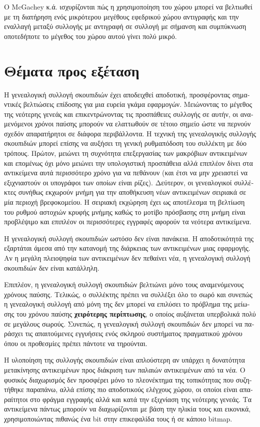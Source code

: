 \begin{greek}
Ο McGachey κ.ά. \cite{DBLP:conf/iwmm/McGacheyH06} ισχυρίζονται
πώς η χρησιμοποίηση του χώρου μπορεί να βελτιωθεί με τη διατήρηση
ενός μικρότερου μεγέθους εφεδρικού χώρου αντιγραφής και την
εναλλαγή μεταξύ συλλογής με αντιγραφή σε συλλογή με σήμανση και
συμπύκνωση οποτεδήποτε το μέγεθος του χώρου αυτού γίνει πολύ
μικρό. 

\section{Θέματα προς εξέταση}
Η γενεαλογική συλλογή σκουπιδιών έχει αποδειχθεί αποδοτική,
προσφέροντας σημαντικές βελτιώσεις επίδοσης για μια ευρεία
γκάμα εφαρμογών. Μειώνοντας το μέγεθος της νεότερης γενεάς
και επικεντρώνοντας τις προσπάθειες συλλογής σε αυτήν, οι
αναμενόμενοι χρόνοι παύσης μπορούν να ελαττωθούν σε τέτοιο
σημείο ώστε να περνούν σχεδόν απαρατήρητοι σε διάφορα περιβάλλοντα.
Η τεχνική της γενεαλογικής συλλογής σκουπιδιών μπορεί επίσης
να αυξήσει τη γενική ρυθμαπόδοση του συλλέκτη με δύο τρόπους.
Πρώτον, μειώνει τη συχνότητα επεξεργασίας των μακρόβιων αντικειμένων
και επομένως όχι μόνο μειώνει την υπολογιστική προσπάθεια αλλά
επιπλέον δίνει στα αντικείμενα αυτά περισσότερο χρόνο για να
πεθάνουν (και έτσι να μην χρειαστεί να εξιχνιαστούν οι υπογράφοι
των οποίων είναι ρίζες). Δεύτερον, οι γενεαλογικοί συλλέκτες
συνήθως εκχωρούν μνήμη για την αποθήκευση νέων αντικειμένων
σειριακά σε μία περιοχή βρεφοκομείου. Η σειριακή εκχώρηση έχει
ως αποτέλεσμα τη βελτίωση του ρυθμού αστοχιών κρυφής μνήμης
καθώς το μοτίβο πρόσβασης στη μνήμη είναι προβλέψιμο και
επιπλέον οι περισσότερες εγγραφές αφορούν τα νεότερα αντικείμενα.

Η γενεαλογική συλλογή σκουπιδιών ωστόσο δεν είναι πανάκεια.
Η αποδοτικότητά της εξαρτάται άμεσα από την κατανομή της διάρκειας
των αντικειμένων μιας εφαρμογής. Αν η μεγάλη πλειοψηφία των
αντικειμένων δεν πεθαίνει νέα, η γενεαλογική συλλογή σκουπιδιών
δεν είναι κατάλληλη.

Επιπλέον, η γενεαλογική συλλογή σκουπιδιών βελτιώνει μόνο
τους αναμενόμενους χρόνους παύσης. Τελικώς, ο συλλέκτης πρέπει
να συλλέξει όλο το σωρό και συνεπώς η γενεαλογική συλλογή από
μόνη της δεν μπορεί να επιλύσει το πρόβλημα της μείωσης του
χρόνου παύσης \textbf{χειρότερης περίπτωσης}, ο οποίος αυξάνεται
υπερβολικά πολύ σε μεγάλους σωρούς. Συνεπώς, η γενεαλογική
συλλογή σκουπιδιών δεν μπορεί να παράσχει τις απαιτούμενες εγγυήσεις
ενός σκληρού συστήματος πραγματικού χρόνου όπου οι προθεσμίες
πρέπει πάντοτε να τηρούνται.

Η υλοποίηση της συλλογής σκουπιδιών είναι απλούστερη αν υπάρχει
η δυνατότητα μετακίνησης αντικειμένων προς διάκριση των παλαιών
αντικειμένων από τα νέα. Ο φυσικός διαχωρισμός δεν προσφέρει
μόνο το πλεονέκτημα της τοπικότητας που συζητήθηκε παραπάνω,
αλλά επίσης πιο αποδοτικούς ελέγχους χώρου, οι οποίοι είναι
απαραίτητοι στο φράγμα εγγραφής αλλά και κατά την εξιχνίαση
της νεότερης γενεάς. Τα αντικείμενα πάντως μπορούν να διαχωρίζονται
με βάση την ηλικία τους και εικονικά, χρησιμοποιώντας πιθανώς
ένα bit στην επικεφαλίδα τους ή σε κάποιο bitmap.


\end{greek}
